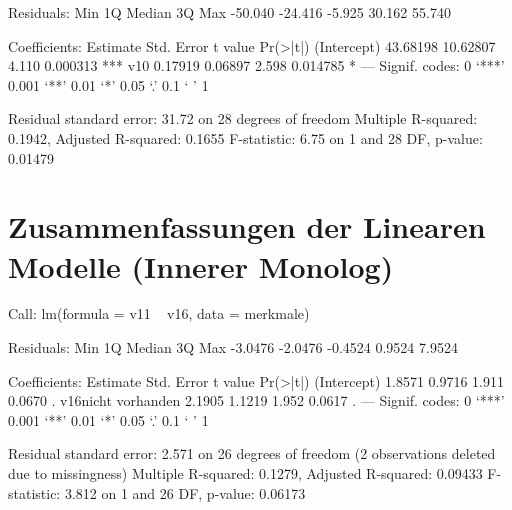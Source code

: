 \begin{Schunk}
\begin{Soutput}
Residuals:
    Min      1Q  Median      3Q     Max 
-50.040 -24.416  -5.925  30.162  55.740 

Coefficients:
            Estimate Std. Error t value Pr(>|t|)    
(Intercept) 43.68198   10.62807   4.110 0.000313 ***
v10          0.17919    0.06897   2.598 0.014785 *  
---
Signif. codes:  0 ‘***’ 0.001 ‘**’ 0.01 ‘*’ 0.05 ‘.’ 0.1 ‘ ’ 1 

Residual standard error: 31.72 on 28 degrees of freedom
Multiple R-squared: 0.1942,	Adjusted R-squared: 0.1655 
F-statistic:  6.75 on 1 and 28 DF,  p-value: 0.01479 
\end{Soutput}
\end{Schunk}



\section{Zusammenfassungen der Linearen Modelle (Innerer Monolog)}

\begin{Schunk}
\begin{Soutput}
Call:
lm(formula = v11 ~ v16, data = merkmale)

Residuals:
    Min      1Q  Median      3Q     Max 
-3.0476 -2.0476 -0.4524  0.9524  7.9524 

Coefficients:
                   Estimate Std. Error t value Pr(>|t|)  
(Intercept)          1.8571     0.9716   1.911   0.0670 .
v16nicht vorhanden   2.1905     1.1219   1.952   0.0617 .
---
Signif. codes:  0 ‘***’ 0.001 ‘**’ 0.01 ‘*’ 0.05 ‘.’ 0.1 ‘ ’ 1 

Residual standard error: 2.571 on 26 degrees of freedom
  (2 observations deleted due to missingness)
Multiple R-squared: 0.1279,	Adjusted R-squared: 0.09433 
F-statistic: 3.812 on 1 and 26 DF,  p-value: 0.06173 
\end{Soutput}
\end{Schunk}
